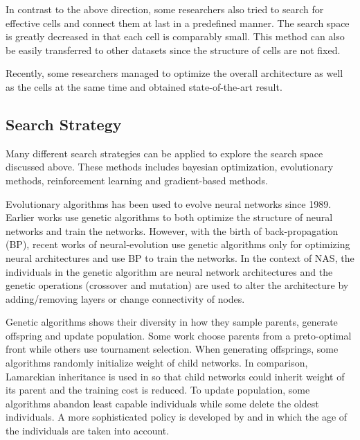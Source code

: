 \documentclass{article}
\begin{document}
\begin{normalsize}
    In contrast to the above direction, some researchers also tried to search for effective cells and connect them at last in a predefined manner\cite{zoph2018learning}\cite{cai2018path}. The search space is greatly decreased in that each cell is comparably small. This method can also be easily transferred to other datasets\cite{zoph2018learning} since the structure of cells are not fixed.

    Recently, some researchers managed to optimize the overall architecture as well as the cells at the same time and obtained state-of-the-art result\cite{liu2019auto}.
    
    \subsection{Search Strategy}
    
    Many different search strategies can be applied to explore the search space discussed above. These methods includes bayesian optimization, evolutionary methods, reinforcement learning and gradient-based methods. 

    Evolutionary algorithms has been used to evolve neural networks since 1989\cite{miller1989designing}. Earlier works use genetic algorithms to both optimize the structure of neural networks and train the networks\cite{stanley2002evolving}. However, with the birth of back-propagation (BP), recent works of neural-evolution use genetic algorithms only for optimizing neural architectures and use BP to train the networks\cite{real2017large}. In the context of NAS, the individuals in the genetic algorithm are neural network architectures and the genetic operations (crossover and mutation) are used to alter the architecture by adding/removing layers or change connectivity of nodes.

    Genetic algorithms shows their diversity in how they sample parents, generate offspring and update population. Some work choose parents from a preto-optimal front\cite{elsken2018efficient} while others use tournament selection\cite{liu2018progressive}\cite{real2018regularized}\cite{real2017large}. When generating offsprings, some algorithms randomly initialize weight of child networks. In comparison, Lamarckian inheritance is used in \cite{elsken2018efficient} so that child networks could inherit weight of its parent and the training cost is reduced. To update population, some algorithms abandon least capable individuals\cite{real2017large} while some delete the oldest individuals\cite{real2018regularized}. A more sophisticated policy is developed by \cite{Hornby:2006:AAP:1143997.1144142} and \cite{DBLP:journals/corr/abs-1802-01548} in which the age of the individuals are taken into account.
    

\end{normalsize}
\end{document}
